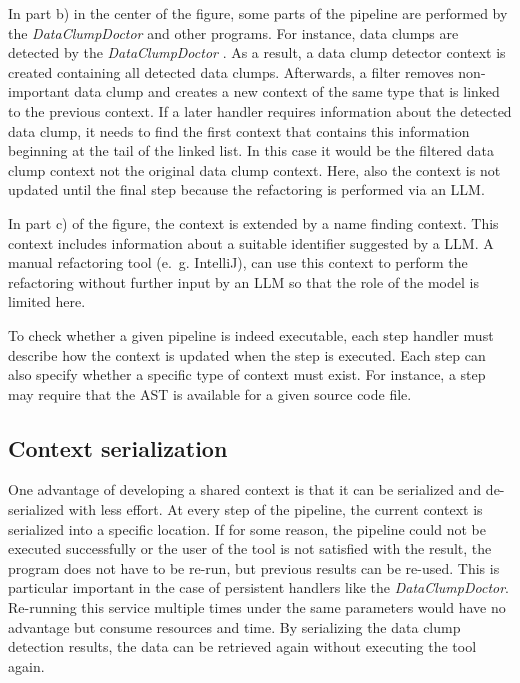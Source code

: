 In part b) in the center of the figure, some parts of the pipeline are performed by the \textit{DataClumpDoctor} and other programs. For instance, data clumps are detected by the \textit{DataClumpDoctor} . As a result, a data clump detector context is created containing all detected data clumps. Afterwards, a filter removes non-important data clump and creates a new context of the same type that is linked to the previous context. If a later handler requires information about the detected data clump, it needs to find the first context that contains this information  beginning at the tail of the linked list. In this case it would be the filtered data clump context not the original data clump context. Here, also the context is not updated until the final step because the refactoring is performed via an \ac{LLM}. 

In part c) of the figure, the context is extended by a name finding context. This context includes information about a suitable identifier suggested by a \ac{LLM}. A manual refactoring tool (e.~g. IntelliJ), can use this context to perform the refactoring without further input by an \ac{LLM} so that the role of the model is limited here. 




To check whether a given pipeline is indeed executable, each step handler must describe how the context is updated when the step is executed. Each step can also specify whether a specific type of context must exist. For instance, a step may require that the \ac{AST} is available for a given source code file. 


\subsection{Context serialization}

One advantage of developing a shared context is that it can be serialized  and de-serialized with less effort. At every step of the pipeline, the current context is serialized into a specific location. If for some reason, the pipeline could not be executed successfully or the user of the tool is not satisfied with the result, the program does not have to be re-run, but previous results can be re-used. This is particular important in the case of persistent handlers like the \textit{DataClumpDoctor}. Re-running this service multiple times under the same parameters would have no advantage but consume resources and time. By serializing the data clump detection results, the data can be retrieved again without executing the tool again.

